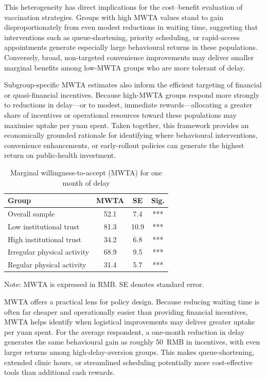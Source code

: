 \documentclass[preprint,12pt]{elsarticle}
\begin{document}
This heterogeneity has direct implications for the cost--benefit evaluation of vaccination
strategies. Groups with high MWTA values stand to gain disproportionately from even modest
reductions in waiting time, suggesting that interventions such as queue-shortening, priority
scheduling, or rapid-access appointments generate especially large behavioural returns in
these populations. Conversely, broad, non-targeted convenience improvements may deliver
smaller marginal benefits among low-MWTA groups who are more tolerant of delay.

Subgroup-specific MWTA estimates also inform the efficient targeting of financial or
quasi-financial incentives. Because high-MWTA groups respond more strongly to reductions in
delay---or to modest, immediate rewards---allocating a greater share of incentives or
operational resources toward these populations may maximise uptake per yuan spent. Taken
together, this framework provides an economically grounded rationale for identifying where
behavioural interventions, convenience enhancements, or early-rollout policies can generate
the highest return on public-health investment.

\begin{table}[!t]
\centering
\caption{Marginal willingness-to-accept (MWTA) for one month of delay}
\label{tab:mwta_subgroups}
\begin{threeparttable}
\begin{tabular}{lccc}
\toprule
Group & MWTA & SE & Sig. \\
\midrule
Overall sample              & 52.1  &  7.4  & *** \\
Low institutional trust     & 81.3  & 10.9  & *** \\
High institutional trust    & 34.2  &  6.8  & *** \\
Irregular physical activity & 68.9  &  9.5  & *** \\
Regular physical activity   & 31.4  &  5.7  & *** \\
\bottomrule
\end{tabular}
\begin{tablenotes}[flushleft]
\footnotesize
\item Note: MWTA is expressed in RMB. SE denotes standard error.
\end{tablenotes}
\end{threeparttable}
\end{table}

MWTA offers a practical lens for policy design. Because reducing waiting time is often 
far cheaper and operationally easier than providing financial incentives, MWTA helps 
identify when logistical improvements may deliver greater uptake per yuan spent. For the 
average respondent, a one-month reduction in delay generates the same behavioural gain as 
roughly 50~RMB in incentives, with even larger returns among high-delay-aversion groups. 
This makes queue-shortening, extended clinic hours, or streamlined scheduling potentially 
more cost-effective tools than additional cash rewards.
\end{document}
